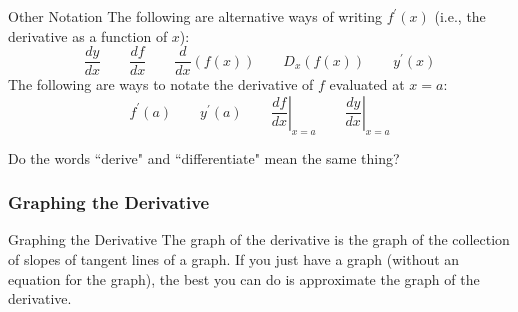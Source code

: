 \documentclass[Cal1Spr16Lectures.tex]{subfiles}
\begin{document}
\begin{frame}{\small Other Notation}
The following are alternative ways of writing $f^{\prime}(x)$ (i.e., the derivative as a function of $x$):
\[\frac{dy}{dx}\qquad\frac{df}{dx} \qquad\frac{d}{dx}\left(f(x)\right) \qquad D_x (f(x)) \qquad y^{\prime}(x)\]
The following are ways to notate the derivative of $f$ evaluated at $x=a$:
\[f^{\prime}(a)\qquad y^{\prime}(a) \qquad \left. \frac{df}{dx} \right|_{x=a} \qquad \left. \frac{dy}{dx} \right|_{x=a}\]
\end{frame}

\begin{frame}
\begin{que}
Do the words ``derive" and ``differentiate" mean the same thing?
\end{que}
\end{frame}

\subsubsection{Graphing the Derivative}

\begin{frame}{\small Graphing the Derivative}
The graph of the derivative is the graph of the collection of slopes of tangent lines of a graph.  If you just have a graph (without an equation for the graph), the best you can do is approximate the graph of the derivative.
\end{frame}
\end{document}
